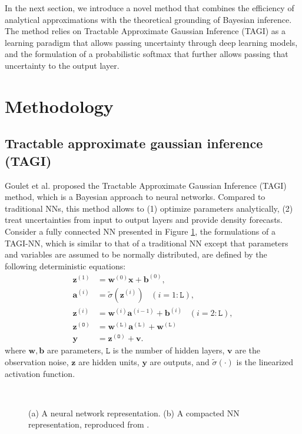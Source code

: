 \documentclass{article}
\begin{document}
In the next section, we introduce a novel method that combines the efficiency of analytical approximations with the theoretical grounding of Bayesian inference. The method relies on Tractable Approximate Gaussian Inference (TAGI) as a learning paradigm that allows passing uncertainty through deep learning models, and the formulation of a probabilistic softmax that further allows passing that uncertainty to the output layer.

\section{Methodology}\label{sec:methodology}
\subsection{Tractable approximate gaussian inference (TAGI)}\label{sub:tagi}
Goulet et al. \cite{goulet2020tractable} proposed the Tractable Approximate Gaussian Inference (TAGI) method, which is a Bayesian approach to neural networks. Compared to traditional NNs, this method allows to (1) optimize parameters analytically, (2) treat uncertainties from input to output layers and provide density forecasts. \\
Consider a fully connected NN presented in Figure \ref{fig:FNN},
the formulations of a TAGI-NN, which is similar to that of a traditional NN except that parameters and variables are assumed to be normally distributed, are defined by the following deterministic equations:
\begin{equation*} \label{eq:TAGI}
\begin{split}
    \bm{z}^{(1)} &= \bm{w}^{(0)} \bm{x} + \bm{b}^{(0)}, \\
    \bm{a}^{(i)} &= \tilde{\sigma}(\bm{z}^{(i)}) \; \; \;(i=1:\mathtt{L}), \\
    \bm{z}^{(i)} &= \bm{w}^{(i)} \bm{a}^{(i-1)} + \bm{b}^{(i)} \; \; \;(i=2:\mathtt{L}), \\
    \bm{z}^{(\mathtt{O})} &=  \bm{w}^{(\mathtt{L})} \bm{a}^{(\mathtt{L})} + \bm{w}^{(\mathtt{L})} \\
    \bm{y} &=  \bm{z}^{(\mathtt{O})} + \bm{v}.
\end{split}
\end{equation*}
where $\bm{w},\bm{b}$ are parameters, $\mathtt{L}$ is the number of hidden layers, $\bm{v}$ are the observation noise, $\bm{z}$ are hidden units, $\bm{y}$ are outputs, and $\tilde{\sigma}(\cdot)$ is the linearized activation function.
\begin{figure}[htbp]
\centering
\subfigure[]{\resizebox{0.9\linewidth}{!}{}}\\
\subfigure[]{\resizebox{0.9
\linewidth}{!}{}}
\caption{(a) A neural network representation. (b) A compacted NN representation, reproduced from \cite{goulet2020tractable}.}
\label{fig:FNN}
\end{figure}
\end{document}
